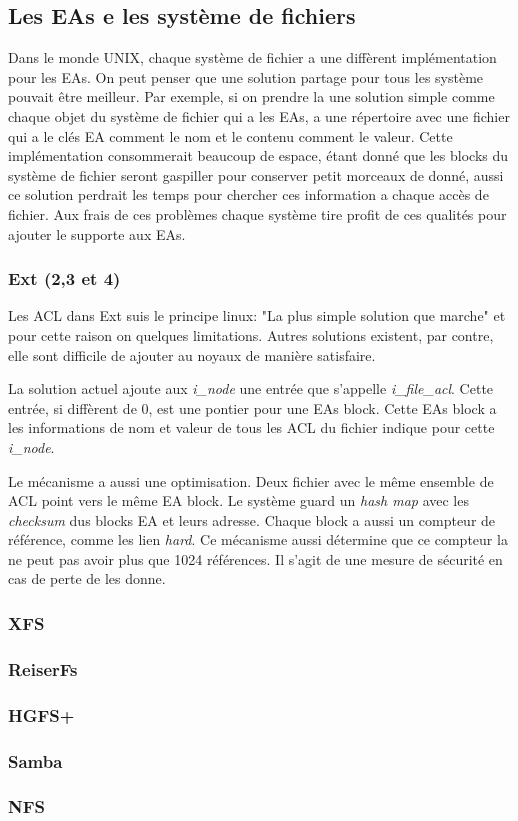 \subsection{Les EAs e les système de fichiers}

Dans le monde UNIX, chaque système de fichier a une diffèrent implémentation pour les EAs. On peut penser que une solution partage pour tous les système pouvait être meilleur. Par exemple, si on prendre la une solution simple comme chaque objet du système de fichier qui a les EAs, a une répertoire avec une fichier qui a le clés EA comment le nom et le contenu comment le valeur. Cette implémentation consommerait beaucoup de espace, étant donné que les blocks du système de fichier seront gaspiller pour conserver petit morceaux de donné, aussi ce solution perdrait les temps pour chercher ces information a chaque accès de fichier. Aux frais de ces problèmes chaque système tire profit de ces qualités pour ajouter le supporte aux EAs. 

\subsubsection*{Ext (2,3 et 4)}

Les ACL dans Ext suis le principe linux: "La plus simple solution que marche" et pour cette raison on quelques limitations. Autres solutions existent, par contre, elle sont difficile de ajouter au noyaux de manière satisfaire\cite{ext_acl}. 

La solution actuel ajoute aux \emph{i\_node} une entrée que s'appelle \emph{i\_file\_acl}. Cette entrée, si diffèrent de 0, est une pontier pour une EAs block. Cette EAs block a les informations de nom et valeur de tous les ACL du fichier indique pour cette \emph{i\_node}.

Le mécanisme a aussi une optimisation. Deux fichier avec le même ensemble de ACL point vers le même EA block. Le système guard un \emph{hash map} avec les \emph{checksum} dus blocks EA et leurs adresse. Chaque block a aussi un compteur de référence, comme les lien \emph{hard}. Ce mécanisme aussi détermine que ce compteur la ne peut pas avoir plus que 1024 références. Il s'agit de une mesure de sécurité en cas de perte de les donne.  

\subsubsection*{XFS}



\subsubsection*{ReiserFs}
\subsubsection*{HGFS+}
\subsubsection*{Samba}
\subsubsection*{NFS}
